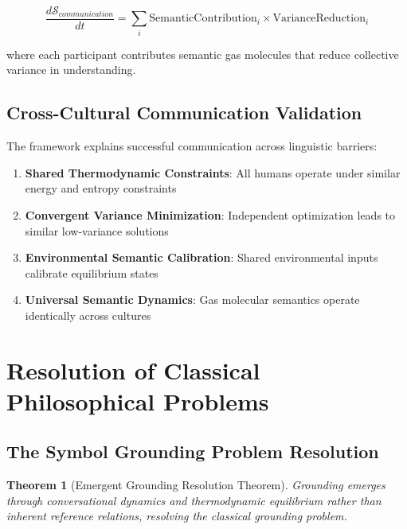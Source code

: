 \documentclass[11pt,a4paper]{article}
\newtheorem{theorem}{Theorem}[section]
\begin{document}
\begin{equation}
\frac{d\mathcal{S}_{communication}}{dt} = \sum_{i} \text{SemanticContribution}_i \times \text{VarianceReduction}_i
\end{equation}

where each participant contributes semantic gas molecules that reduce collective variance in understanding.

\subsection{Cross-Cultural Communication Validation}

The framework explains successful communication across linguistic barriers:

\begin{enumerate}
\item \textbf{Shared Thermodynamic Constraints}: All humans operate under similar energy and entropy constraints
\item \textbf{Convergent Variance Minimization}: Independent optimization leads to similar low-variance solutions
\item \textbf{Environmental Semantic Calibration}: Shared environmental inputs calibrate equilibrium states
\item \textbf{Universal Semantic Dynamics}: Gas molecular semantics operate identically across cultures
\end{enumerate}

\section{Resolution of Classical Philosophical Problems}

\subsection{The Symbol Grounding Problem Resolution}

\begin{theorem}[Emergent Grounding Resolution Theorem]
Grounding emerges through conversational dynamics and thermodynamic equilibrium rather than inherent reference relations, resolving the classical grounding problem.
\end{theorem}
\end{document}
